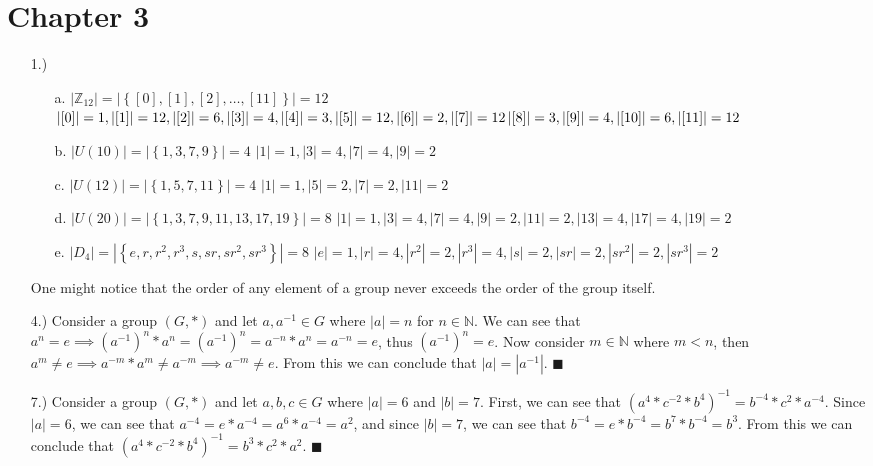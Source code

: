 \documentclass[12pt]{article}
\newcommand{\vertb}[1]{\left\vert#1\right\vert}      %
\newcommand{\braces}[1]{\left\{#1\right\}}           %
\newcommand{\parens}[1]{\left(#1\right)}             %
\newcommand{\N}{\mathbb{N}}
\newcommand{\Z}{\mathbb{Z}}
\begin{document}
\section*{Chapter 3}
\begin{itemize}
    \item [1.)] \begin{itemize}
        \item [a.] $\vertb{\Z_{12}}=\vertb{\braces{[0],[1],[2],\dots,[11]}}=12$\newline
        $\vertb{[0]}=1,\vertb{[1]}=12,\vertb{[2]}=6,\vertb{[3]}=4,\vertb{[4]}=3,\vertb{[5]}=12,\vertb{[6]}=2,\vertb{[7]}=12\break\vertb{[8]}=3,\vertb{[9]}=4,\vertb{[10]}=6,\vertb{[11]}=12$

        \item [b.] $\vertb{U(10)}=\vertb{\braces{1,3,7,9}}=4$\newline
        $\vertb{1}=1,\vertb{3}=4,\vertb{7}=4,\vertb{9}=2$

        \item [c.] $\vertb{U(12)}=\vertb{\braces{1,5,7,11}}=4$\newline
        $\vertb{1}=1,\vertb{5}=2,\vertb{7}=2,\vertb{11}=2$

        \item [d.] $\vertb{U(20)}=\vertb{\braces{1,3,7,9,11,13,17,19}}=8$\newline
        $\vertb{1}=1,\vertb{3}=4,\vertb{7}=4,\vertb{9}=2,\vertb{11}=2,\vertb{13}=4,\vertb{17}=4,\vertb{19}=2$

        \item [e.] $\vertb{D_4}=\vertb{\braces{e,r,r^2,r^3,s,sr,sr^2,sr^3}}=8$\newline
        $\vertb{e}=1,\vertb{r}=4,\vertb{r^2}=2,\vertb{r^3}=4,\vertb{s}=2,\vertb{sr}=2,\vertb{sr^2}=2,\vertb{sr^3}=2$
    \end{itemize}
    One might notice that the order of any element of a group never exceeds the order of the group itself.

    \pagebreak
    \item [4.)] Consider a group $(G,*)$ and let $a,a^{-1}\in G$ where $\vertb{a}=n$ for $n\in\N$. We can see that $a^n=e\implies\parens{a^{-1}}^n*a^n=\parens{a^{-1}}^n=a^{-n}*a^n=a^{-n}=e$, thus $\parens{a^{-1}}^n=e$. Now consider $m\in\N$ where $m<n$, then $a^m\ne e\implies a^{-m}*a^m\ne a^{-m}\implies a^{-m}\ne e$. From this we can conclude that $\vertb{a}=\vertb{a^{-1}}$. $\blacksquare$

    \item [7.)] Consider a group $(G,*)$ and let $a,b,c\in G$ where $\vertb{a}=6$ and $\vertb{b}=7$. First, we can see that $\parens{a^4*c^{-2}*b^4}^{-1}=b^{-4}*c^2*a^{-4}$. Since $\vertb{a}=6$, we can see that $a^{-4}=e*a^{-4}=a^6*a^{-4}=a^2$, and since $\vertb{b}=7$, we can see that $b^{-4}=e*b^{-4}=b^7*b^{-4}=b^3$. From this we can conclude that $\parens{a^4*c^{-2}*b^4}^{-1}=b^3*c^2*a^2$. $\blacksquare$


\end{itemize}
\end{document}
